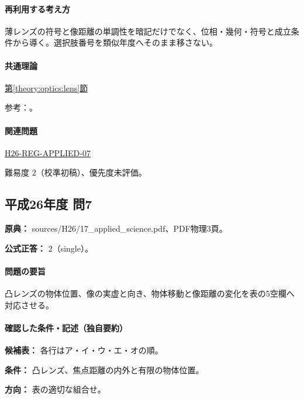 \paragraph{再利用する考え方} 薄レンズの符号と像距離の単調性を暗記だけでなく、位相・幾何・符号と成立条件から導く。選択肢番号を類似年度へそのまま移さない。

\paragraph{共通理論} \hyperref[theory:optics:lens]{第\ref*{theory:optics:lens}節}

\par 参考：\cite{os_lens}。

\paragraph{関連問題} \hyperref[q:h26-reg-applied-07]{H26-REG-APPLIED-07}

\par 難易度 2（校準初稿）、優先度未評価。

\subsection{平成26年度 問7}
\label{q:h26-reg-applied-07}

\noindent\textbf{原典：} sources/H26/17\_applied\_science.pdf、PDF物理3頁。

\textbf{公式正答：} 2（single）。

\paragraph{問題の要旨} 凸レンズの物体位置、像の実虚と向き、物体移動と像距離の変化を表の5空欄へ対応させる。

\paragraph{確認した条件・記述（独自要約）}\mbox{}\par

\noindent\textbf{候補表：} 各行はア・イ・ウ・エ・オの順。\par

\noindent\textbf{条件：} 凸レンズ、焦点距離の内外と有限の物体位置。\par

\noindent\textbf{方向：} 表の適切な組合せ。\par

